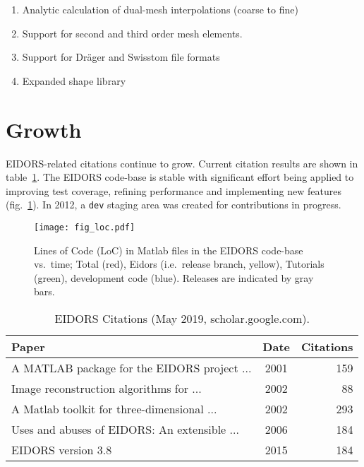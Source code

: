 \documentclass[10pt,a4paper]{article}
\begin{document}
\begin{multicols}{2}
\begin{enumerate}
\item Analytic calculation of dual-mesh interpolations (coarse to fine)

\item Support for second and third order mesh elements.

\item Support for Dr\"ager and Swisstom file formats

\item Expanded shape library
\end{enumerate}

\section{Growth}
EIDORS-related citations continue to grow. Current citation results are
shown in table~\ref{tbl:cite}.
%
The EIDORS code-base is stable with significant effort being applied to
improving test coverage, refining performance and implementing new features
(fig.~\ref{fig:loc}). In 2012, a {\tt dev} staging area was created for
contributions in progress.

\begin{figure}[H]
  \vspace{-2.5mm}
\centering
\texttt{[image: fig\_loc.pdf]}
\caption{\label{fig:loc}%
  Lines of Code (LoC) in Matlab files in the EIDORS code-base vs.\ time; Total
   (red), Eidors (i.e.\ release branch, yellow), Tutorials (green), development code (blue).
   Releases are indicated by gray bars.
}
\end{figure}
\vspace{-1.5em}
\begin{table}[H]
  \footnotesize
\centering
\caption{\label{tbl:cite} EIDORS Citations
 (May 2019, scholar.google.com).
}
\begin{tabular}{lcr}
  \toprule
  Paper & Date & \hspace{-2mm}Citations \\
  \midrule
  \cite{vauhkonen2001} A MATLAB package for the EIDORS project {\tiny ...}  
    & 2001 & 159 \\
  \cite{polydorides2002phd} Image reconstruction algorithms for {\tiny ...}  
    & 2002 & 88 \\
  \cite{polydorides2002matlab} A Matlab toolkit for three-dimensional {\tiny ...}  
    & 2002 & 293 \\
  \cite{adler2006} Uses and abuses of {EIDORS}: An extensible {\tiny ...} 
    & 2006 & 184 \\
  \cite{adler2006} EIDORS version 3.8
    & 2015 & 184 \\
  \bottomrule
\end{tabular}
\vspace{-1em}
\end{table}


\end{multicols}
\end{document}
